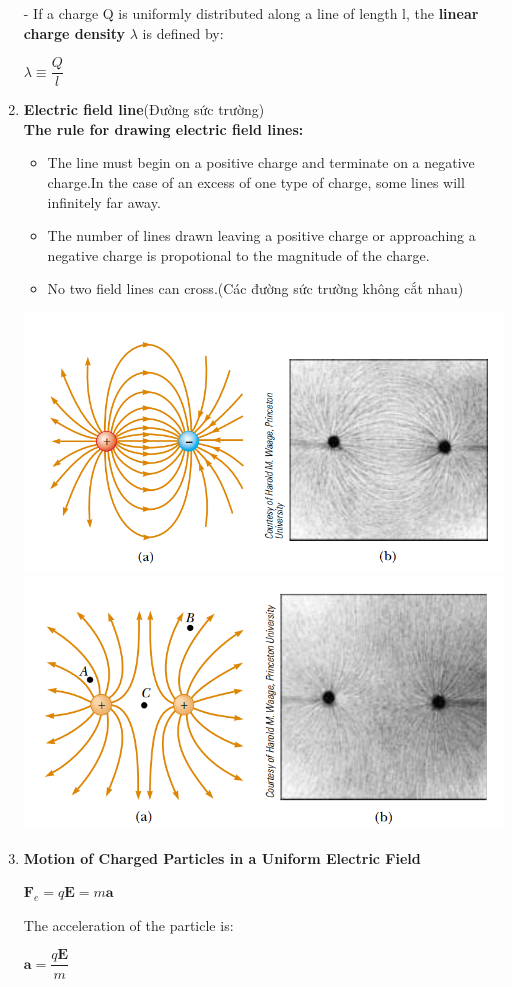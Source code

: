 \documentclass[10pt]{article}
\begin{document}
\begin{enumerate}
	- If a charge Q is uniformly distributed along a line of length l, the \textbf{linear charge density} $\lambda$ is defined by:
	\begin{mybox}
	\begin{center}
	$\lambda \equiv \dfrac{Q}{l}$
	\end{center}
	\end{mybox}
	\item \textbf{Electric field line}(Đường sức trường)\\
	\textbf{The rule for drawing electric field lines:}
	\begin{itemize}
	\item The line must begin on a positive charge and terminate on a negative charge.In the case of an excess of one type of charge, some lines will infinitely far away.
	\item The number of lines drawn leaving a positive charge or approaching a negative charge is propotional to the magnitude of the charge.
	\item No two field lines can cross.(Các đường sức trường không cắt nhau)
	\end{itemize}
	\includegraphics{hinh5}\\
	\includegraphics{hinh6}
	\item \textbf{Motion of Charged Particles in a Uniform Electric Field}\\
	\begin{mybox}
	\begin{center}
	$\textbf{F}_e = q \textbf{E} = m \textbf{a}$
	\end{center}
	\end{mybox}
	The acceleration of the particle is:
	\begin{center}
	$\textbf{a} = \dfrac{q \textbf{E}}{m}$
	\end{center}
\end{enumerate}
\end{document}
